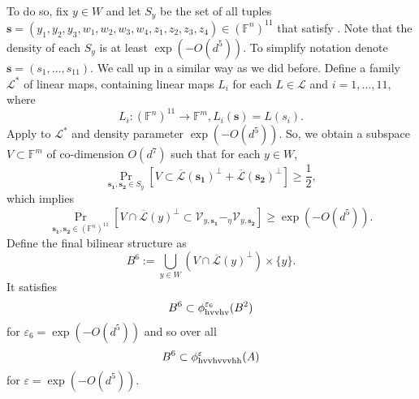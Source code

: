\documentclass[12pt]{article}
\newcommand{\F}{\mathbb{F}}
\newcommand{\hr}{\textup{h}}
\newcommand{\vr}{\textup{v}}
\newcommand{\LL}{\mathcal{L}}
\newcommand{\s}{\mathbf{s}}
\newcommand{\eps}{\varepsilon}
\begin{document}
To do so, fix $y\in W$ and let $S_y$ be the set of all tuples $\s = (y_1,y_2,y_3,w_1,w_2,w_3,w_4,z_1,z_2,z_3,z_4)\in (\F^n)^{11}$ that satisfy . Note that the density of each $S_y$ is at least $\exp(-O(d^5))$. To simplify notation denote $\s = (s_1,\ldots,s_{11})$.
We call up  in a similar way as we did before.  Define a family $\LL^*$ of linear maps, containing linear maps $L_i$ for each $L\in \LL$ and $i=1,\ldots,11$, where
$$
L_i:(\F^{n})^{11}\rightarrow\F^{m}, L_i(\s) = L(s_i).
$$
Apply  to $\LL^*$ and density parameter $\exp(-O(d^5))$. So, we obtain a subspace $V \subset \F^m$ of co-dimension $O(d^7)$ such that for each $y \in W$,
\begin{equation}\label{equation:final}
	\Pr_{\mathbf{s_1},\mathbf{s_2}\in S_y}\left[V\subset \overline{\LL}(\mathbf{s_1})^\perp+\overline{\LL}(\mathbf{s_2})^\perp\right]\geq \frac{1}{2},
\end{equation}
which implies
\begin{equation}\label{equation:afterfinal}
	\Pr_{\mathbf{s_1},\mathbf{s_2}\in (\F^n)^{11}}\left[V\cap  \overline{\LL}(y)^\perp \subset  \mathcal{V}_{y,\mathbf{s_1}}-_\eta \mathcal{V}_{y,\mathbf{s_2}} \right]\geq \exp(-O(d^5)).
\end{equation}
Define the final bilinear structure as
$$
B^6:= \bigcup_{y\in W}\left( V \cap {\overline{\LL}(y)}^\perp \right) \times \{y\}.
$$
It satisfies
$$
B^6\subset \phi_{\hr\vr\vr\hr\vr}^{\eps_6}(B^2)
$$
for $\eps_6 = \exp(-O(d^5))$
and so over all
$$B^6 \subset \phi_{\hr\vr\vr\hr\vr\vr\vr\hr\hr}^\eps(A)$$
for $\eps = \exp(-O(d^5))$.
\end{document}
